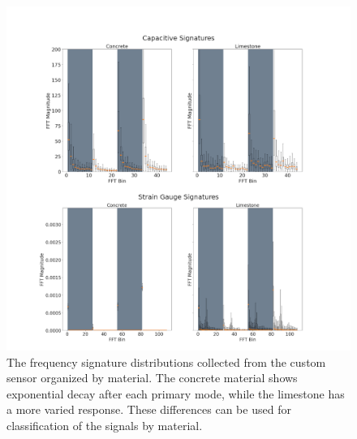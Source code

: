 \begin{figure}[t!]
\centering
\centerline{\includegraphics[width=5.5in]{figures/p1_media/Fig8.png}}
\caption{
The frequency signature distributions collected from the custom sensor organized by material.
The concrete material shows exponential decay after each primary mode, while the limestone 
 has a more varied response. These differences can be used for classification of the signals by material.
}
\label{fig:matsigs}
\end{figure}

